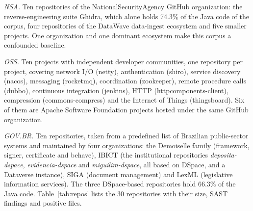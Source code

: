 \documentclass[a4paper,twoside]{article}
\begin{document}
\textit{NSA.} Ten repositories of the NationalSecurityAgency GitHub organization: the reverse-engineering suite Ghidra, which alone holds 74.3\% of the Java code of the corpus, four repositories of the DataWave data-ingest ecosystem and five smaller projects. One organization and one dominant ecosystem make this corpus a confounded baseline.

\textit{OSS.} Ten projects with independent developer communities, one repository per project, covering network I/O (netty), authentication (shiro), service discovery (nacos), messaging (rocketmq), coordination (zookeeper), remote procedure calls (dubbo), continuous integration (jenkins), HTTP (httpcomponents-client), compression (commons-compress) and the Internet of Things (thingsboard). Six of them are Apache Software Foundation projects hosted under the same GitHub organization.

\textit{GOV.BR.} Ten repositories, taken from a predefined list of Brazilian public-sector systems and maintained by four organizations: the Demoiselle family (framework, signer, certificate and behave), IBICT (the institutional repositories \textit{deposita-dspace}, \textit{evidencia-dspace} and \textit{miguilim-dspace}, all based on DSpace, and a Dataverse instance), SIGA (document management) and LexML (legislative information services). The three DSpace-based repositories hold 66.3\% of the Java code. Table~\ref{tab:repos} lists the 30 repositories with their size, SAST findings and positive files.
\end{document}

